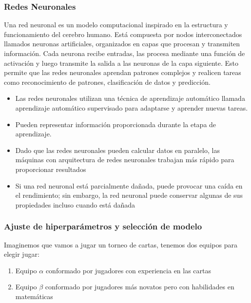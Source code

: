 \subsubsection*{Redes Neuronales}

Una red neuronal es un modelo computacional inspirado en la estructura y funcionamiento del 
cerebro humano. Está compuesta por nodos interconectados llamados neuronas artificiales, 
organizados en capas que procesan y transmiten información. Cada neurona recibe entradas, las 
procesa mediante una función de activación y luego transmite la salida a las neuronas de la capa 
siguiente. Esto permite que las redes neuronales aprendan patrones complejos y realicen tareas 
como reconocimiento de patrones, clasificación de datos y predicción.

\begin{itemize}
    \item Las redes neuronales utilizan una técnica de aprendizaje automático llamada aprendizaje 
    automático supervisado para adaptarse y aprender nuevas tareas.
    \item Pueden representar información proporcionada durante la etapa de aprendizaje.
    \item Dado que las redes neuronales pueden calcular datos en paralelo, las máquinas con 
    arquitectura de redes neuronales trabajan más rápido para proporcionar resultados
    \item Si una red neuronal está parcialmente dañada, puede provocar una caída en el 
    rendimiento; sin embargo, la red neuronal puede conservar algunas de sus propiedades 
    incluso cuando está dañada
\end{itemize}

\subsubsection*{Ajuste de hiperparámetros y selección de modelo}


Imaginemos que vamos a jugar un torneo de cartas, tenemos dos equipos para elegir jugar:
\begin{enumerate}
    \item Equipo $\alpha$ conformado por jugadores con experiencia en las cartas
    \item Equipo $\beta$ conformado por jugadores más novatos pero con habilidades en matemáticas
\end{enumerate}

